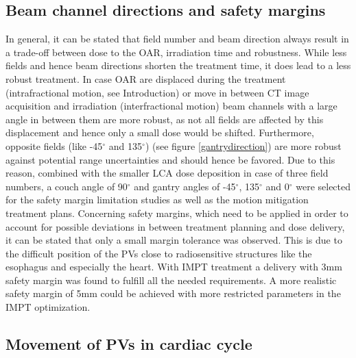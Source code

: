 \subsection{Beam channel directions and safety margins}
In general, it can be stated that field number and beam direction always result in a trade-off between dose to the OAR, irradiation time and 
robustness. While less fields and hence beam directions shorten the treatment time, it does lead to a less robust treatment. In case OAR are 
displaced during the treatment (intrafractional motion, see Introduction) or move in between CT image acquisition and irradiation 
(interfractional motion) beam channels with a large angle in between them are more robust, as not all fields are affected by this displacement 
and hence only a small dose would be shifted. Furthermore, opposite fields (like -45$^{\circ}$ and 135$^{\circ}$) (see figure 
\ref{gantrydirection}) are more robust against potential range uncertainties and should hence be favored. Due to this reason, combined with 
the smaller LCA dose deposition in case of three field numbers, a couch angle of 90$^{\circ}$ and gantry angles of -45$^{\circ}$, 
135$^{\circ}$ and 0$^{\circ}$ were selected for the safety margin limitation studies as well as the motion mitigation treatment plans. 
Concerning safety margins, which need to be applied in order to account for possible deviations in between treatment planning and dose 
delivery, it can be stated that only a small margin tolerance was observed. This is due to the difficult position of the PVs close to 
radiosensitive structures like the esophagus and especially the heart. With IMPT treatment a delivery with 3mm safety margin was found to 
fulfill all the needed requirements. A more realistic safety margin of 5mm could be achieved with more restricted parameters in the IMPT 
optimization. 


\subsection{Movement of PVs in cardiac cycle}

